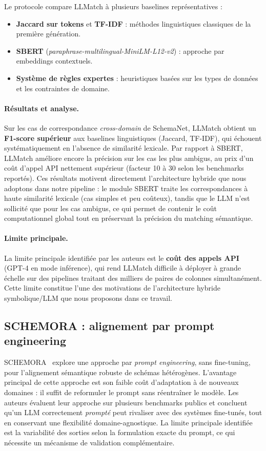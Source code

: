 Le protocole compare LLMatch à plusieurs baselines représentatives :
\begin{itemize}
    \item \textbf{Jaccard sur tokens} et \textbf{TF-IDF} :
          méthodes linguistiques classiques de la première génération.
    \item \textbf{SBERT} (\textit{paraphrase-multilingual-MiniLM-L12-v2}) :
          approche par embeddings contextuels.
    \item \textbf{Système de règles expertes} :
          heuristiques basées sur les types de données et les
          contraintes de domaine.
\end{itemize}

\paragraph{Résultats et analyse.}
Sur les cas de correspondance \textit{cross-domain}
de SchemaNet, LLMatch obtient un \textbf{F1-score
supérieur} aux baselines linguistiques (Jaccard, TF-IDF),
qui échouent systématiquement en l'absence de similarité lexicale.
Par rapport à SBERT, LLMatch améliore encore la précision
sur les cas les plus ambigus, au prix d'un coût d'appel API
nettement supérieur (facteur 10 à 30 selon les benchmarks reportés).
Ces résultats motivent directement l'architecture hybride
que nous adoptons dans notre pipeline : le module SBERT traite
les correspondances à haute similarité lexicale (cas simples et
peu coûteux), tandis que le LLM n'est sollicité que pour les
cas ambigus, ce qui permet de contenir le coût computationnel
global tout en préservant la précision du matching sémantique.

\paragraph{Limite principale.}
La limite principale identifiée par les auteurs est
le \textbf{coût des appels API} (GPT-4 en mode inférence),
qui rend LLMatch difficile à déployer à grande échelle
sur des pipelines traitant des milliers de paires
de colonnes simultanément.
Cette limite constitue l'une des motivations de l'architecture
hybride symbolique/LLM que nous proposons dans ce travail.

\subsection{SCHEMORA : alignement par prompt engineering}
SCHEMORA~\cite{schemora2025} explore une approche par \textit{prompt engineering}, sans fine-tuning, pour l'alignement sémantique robuste de schémas hétérogènes. L'avantage principal de cette approche est son faible coût d'adaptation à de nouveaux domaines : il suffit de reformuler le prompt sans réentraîner le modèle. Les auteurs évaluent leur approche sur plusieurs benchmarks publics et concluent qu'un LLM correctement \textit{prompté} peut rivaliser avec des systèmes fine-tunés, tout en conservant une flexibilité domaine-agnostique. La limite principale identifiée est la variabilité des sorties selon la formulation exacte du prompt, ce qui nécessite un mécanisme de validation complémentaire.

